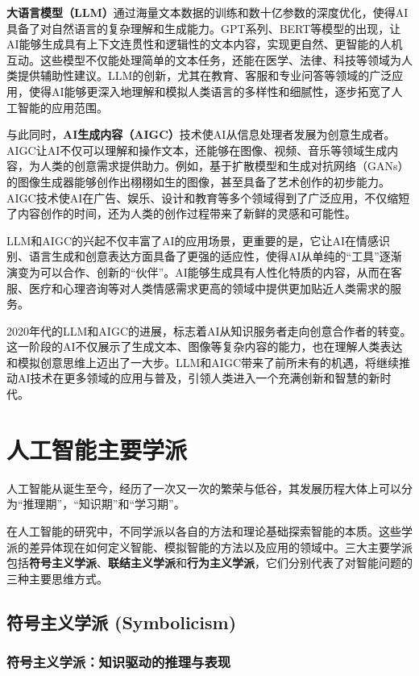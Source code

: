 {\bf 大语言模型（LLM）}通过海量文本数据的训练和数十亿参数的深度优化，使得AI具备了对自然语言的复杂理解和生成能力。GPT系列、BERT等模型的出现，让AI能够生成具有上下文连贯性和逻辑性的文本内容，实现更自然、更智能的人机互动。这些模型不仅能处理简单的文本任务，还能在医学、法律、科技等领域为人类提供辅助性建议。LLM的创新，尤其在教育、客服和专业问答等领域的广泛应用，使得AI能够更深入地理解和模拟人类语言的多样性和细腻性，逐步拓宽了人工智能的应用范围。

与此同时，{\bf AI生成内容（AIGC）}技术使AI从信息处理者发展为创意生成者。AIGC让AI不仅可以理解和操作文本，还能够在图像、视频、音乐等领域生成内容，为人类的创意需求提供助力。例如，基于扩散模型和生成对抗网络（GANs）的图像生成器能够创作出栩栩如生的图像，甚至具备了艺术创作的初步能力。AIGC技术使AI在广告、娱乐、设计和教育等多个领域得到了广泛应用，不仅缩短了内容创作的时间，还为人类的创作过程带来了新鲜的灵感和可能性。

LLM和AIGC的兴起不仅丰富了AI的应用场景，更重要的是，它让AI在情感识别、语言生成和创意表达方面具备了更强的适应性，使得AI从单纯的“工具”逐渐演变为可以合作、创新的“伙伴”。AI能够生成具有人性化特质的内容，从而在客服、医疗和心理咨询等对人类情感需求更高的领域中提供更加贴近人类需求的服务。

2020年代的LLM和AIGC的进展，标志着AI从知识服务者走向创意合作者的转变。这一阶段的AI不仅展示了生成文本、图像等复杂内容的能力，也在理解人类表达和模拟创意思维上迈出了一大步。LLM和AIGC带来了前所未有的机遇，将继续推动AI技术在更多领域的应用与普及，引领人类进入一个充满创新和智慧的新时代。

\section{人工智能主要学派}

人工智能从诞生至今，经历了一次又一次的繁荣与低谷，其发展历程大体上可以分为“推理期”，“知识期”和“学习期”。\cite{周志华2016} 

在人工智能的研究中，不同学派以各自的方法和理论基础探索智能的本质。这些学派的差异体现在如何定义智能、模拟智能的方法以及应用的领域中。三大主要学派包括{\bf 符号主义学派}、{\bf 联结主义学派}和{\bf 行为主义学派}，它们分别代表了对智能问题的三种主要思维方式。

\subsection{符号主义学派 (Symbolicism)}

\subsubsection*{符号主义学派：知识驱动的推理与表现}

